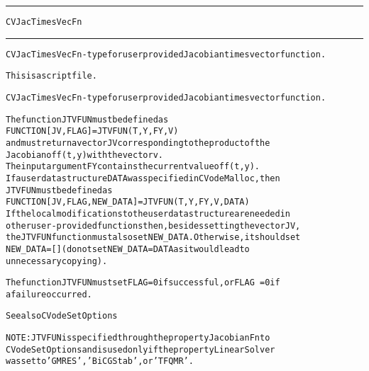 \begin{samepage}
\hrule
\begin{center}
{\large \verb!CVJacTimesVecFn!}
\label{p:CVJacTimesVecFn}
\end{center}
\hrule\vspace{0.1in}



\begin{alltt}
CVJacTimesVecFn - type for user provided Jacobian times vector function.
\end{alltt}

\end{samepage}



\begin{samepage}


\begin{alltt}
This is a script file. 
\end{alltt}

\end{samepage}



\begin{alltt}
CVJacTimesVecFn - type for user provided Jacobian times vector function.

   The function JTVFUN must be defined as 
        FUNCTION [JV, FLAG] = JTVFUN(T,Y,FY,V)
   and must return a vector JV corresponding to the product of the 
   Jacobian of f(t,y) with the vector v.
   The input argument FY contains the current value of f(t,y).
   If a user data structure DATA was specified in CVodeMalloc, then
   JTVFUN must be defined as
        FUNCTION [JV, FLAG, NEW_DATA] = JTVFUN(T,Y,FY,V,DATA)
   If the local modifications to the user data structure are needed in
   other user-provided functions then, besides setting the vector JV,
   the JTVFUN function must also set NEW_DATA. Otherwise, it should set
   NEW_DATA=[] (do not set NEW_DATA = DATA as it would lead to
   unnecessary copying).

   The function JTVFUN must set FLAG=0 if successful, or FLAG~=0 if
   a failure occurred.

   See also CVodeSetOptions

   NOTE: JTVFUN is specified through the property JacobianFn to
   CVodeSetOptions and is used only if the property LinearSolver
   was set to 'GMRES', 'BiCGStab', or 'TFQMR'.
\end{alltt}






\vspace{0.1in}